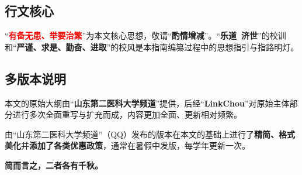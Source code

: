 \subsection[行文核心]{行文核心}
“\textcolor{red}{\textbf{有备无患、举要治繁}}”为本文核心思想，敬请“\textbf{酌情增减}”。“\textbf{乐道\ 济世}”的校训和“\textbf{严谨、求是、勤奋、进取}”的校风是本指南编纂过程中的思想指引与指路明灯。

\subsection[多版本说明]{多版本说明}
本文的原始大纲由“\textbf{山东第二医科大学频道}”提供，后经“\textbf{LinkChou}”对原始主体部分进行多次全面重写与扩充而成，内容更加全面、更新相对频繁。

由“山东第二医科大学频道”（QQ）发布的版本在本文的基础上进行了\textbf{精简、格式美化}并\textbf{添加了各类优惠政策}，通常在暑假中发版，每学年更新一次。

\textbf{简而言之，二者各有千秋。}
